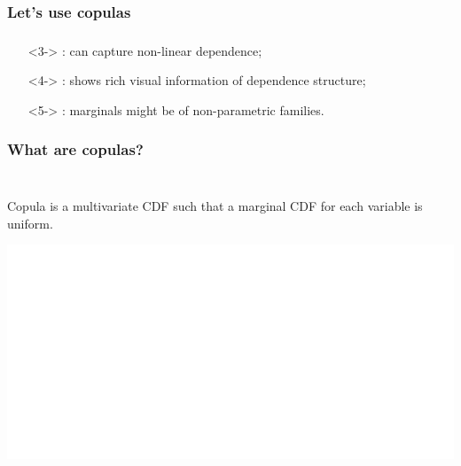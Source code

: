 \documentclass[aspectratio=169]{beamer}
\begin{document}
		\subsubsection{Let's use copulas}
			\begin{frame}
				\frametitle{\insertsubsubsection}
				
				\begin{itemize}
					\item[]<3-> : can capture non-linear dependence;
					\item[]<4-> : shows rich visual information of dependence structure;
					\item[]<5-> : marginals might be of non-parametric families.
					
				\end{itemize}
				
			\end{frame}
			
		\subsubsection{What are copulas?}
			\begin{frame}
				\frametitle{\insertsubsubsection}
				~\\[1em]
				Copula is a multivariate CDF such that a marginal CDF for each variable is uniform. \\[1em]
				
				\begin{center}
					\includegraphics[width=0.75\linewidth]{plots/introduction/blank}
				\end{center}
				
			\end{frame}
			
\end{document}
